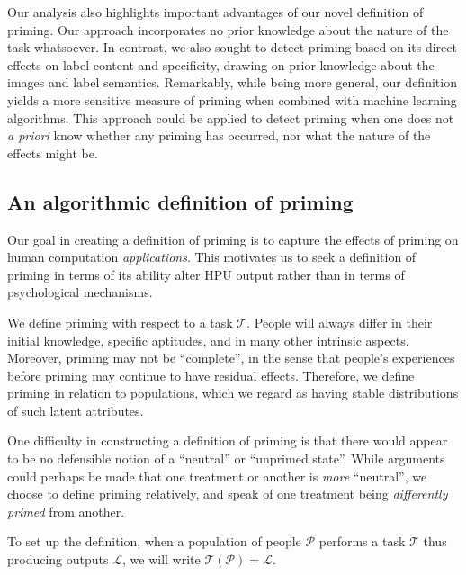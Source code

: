 \documentclass[letterpaper]{article}
\begin{document}
Our analysis also highlights important advantages of our novel definition of 
priming.  Our approach incorporates no prior knowledge about the nature
of the task whatsoever.  In contrast, we also sought to detect priming
based on its direct effects on label content and specificity,
drawing on prior knowledge about the images and label semantics.
Remarkably, while being more general, our definition yields a more sensitive
measure of priming when combined with machine learning algorithms. 
This approach could be applied to detect priming when one does not 
\emph{a priori} know whether any priming has occurred, 
nor what the nature of the effects might be.
\subsection*{An algorithmic definition of priming}
Our goal in creating a definition of priming is to capture the effects of 
priming on human computation \textit{applications}.  This motivates us to 
seek a definition of priming in terms of its ability alter HPU 
output rather than in terms of psychological mechanisms. 

We define priming with respect to a task $\mathcal{T}$.  People will always differ in their initial knowledge, specific 
aptitudes, and in many other intrinsic aspects.  Moreover, priming may not be 
``complete'', in the sense that people's experiences before
priming may continue to have residual effects.  Therefore, we define priming 
in relation to populations, which we regard as having stable distributions of
such latent attributes.

One difficulty in constructing a definition of priming is that there would 
appear to be no defensible notion of a ``neutral'' or ``unprimed state''.  
While arguments could perhaps be made that one treatment or another is 
\textit{more} ``neutral'', we choose to define priming relatively, and speak 
of one treatment being \textit{differently primed} from another.


To set up the definition, when a population of people $\mathcal{P}$ performs
a task $\mathcal{T}$ thus producing outputs $\mathcal{L}$,
we will write $\mathcal{T}(\mathcal{P}) = \mathcal{L}$.
\end{document}
